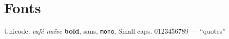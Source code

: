 \documentclass{article}
\begin{document}
\section{Fonts}Unicode: \textit{caf\'e na\"ive} \textbf{bold}, {\sffamily sans}, \texttt{mono}, {\scfont Small caps}.
0123456789 --- ``quotes''
\end{document}
